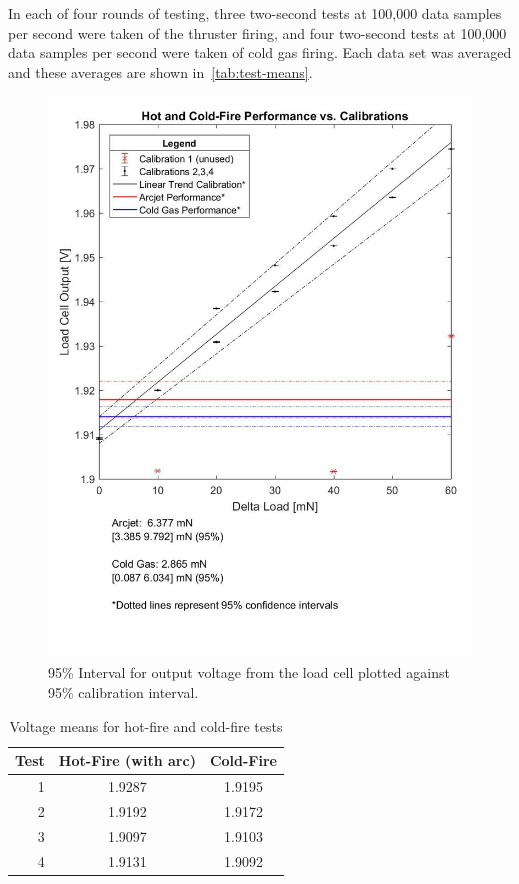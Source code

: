 \documentclass[journal]{IEEEtran}
\begin{document}
In each of four rounds of testing, three two-second tests at 100,000 data samples per second were taken of the thruster firing, and four two-second tests at 100,000 data samples per second were taken of cold gas firing.
Each data set was averaged and these averages are shown in~\autoref{tab:test-means}.

\begin{figure}
  \includegraphics[width=\linewidth]{figs/thrust-data.jpg}
  \caption{95\% Interval for output voltage from the load cell plotted against 95\% calibration interval.}
\label{fig:curve}
\end{figure}

\begin{table}
  \centering
  \caption{Voltage means for hot-fire and cold-fire tests
\label{tab:test-means}}
  \begin{tabular}{rcc}
    \toprule
    Test & Hot-Fire (with arc) & Cold-Fire \\ \midrule
    1 & 1.9287 & 1.9195 \\
    2 & 1.9192 & 1.9172 \\
    3 & 1.9097 & 1.9103 \\
    4 & 1.9131 & 1.9092 \\
    \bottomrule
  \end{tabular}
\end{table}
\end{document}
